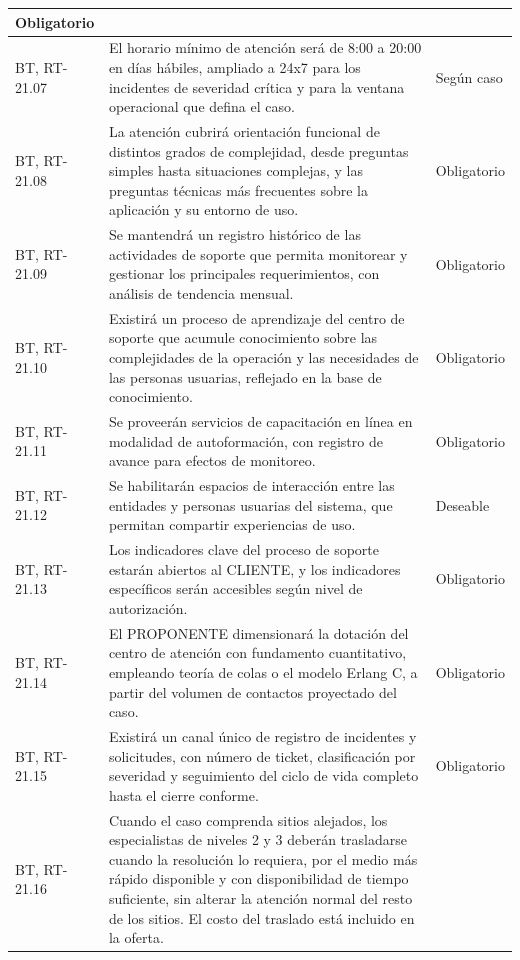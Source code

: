 \begin{longtable}{|L{0.098425\AnchoTablaAnexo}|L{0.814961\AnchoTablaAnexo}|L{0.086614\AnchoTablaAnexo}|}
Obligatorio \\ \hline
{}
BT, RT-21.07 &
El horario mínimo de atención será de 8:00 a 20:00 en días hábiles, ampliado a 24x7 para los incidentes de severidad crítica y para la ventana operacional que defina el caso. &
Según caso \\ \hline
BT, RT-21.08 &
La atención cubrirá orientación funcional de distintos grados de complejidad, desde preguntas simples hasta situaciones complejas, y las preguntas técnicas más frecuentes sobre la aplicación y su entorno de uso. &
Obligatorio \\ \hline
{}
BT, RT-21.09 &
Se mantendrá un registro histórico de las actividades de soporte que permita monitorear y gestionar los principales requerimientos, con análisis de tendencia mensual. &
Obligatorio \\ \hline
BT, RT-21.10 &
Existirá un proceso de aprendizaje del centro de soporte que acumule conocimiento sobre las complejidades de la operación y las necesidades de las personas usuarias, reflejado en la base de conocimiento. &
Obligatorio \\ \hline
{}
BT, RT-21.11 &
Se proveerán servicios de capacitación en línea en modalidad de autoformación, con registro de avance para efectos de monitoreo. &
Obligatorio \\ \hline
BT, RT-21.12 &
Se habilitarán espacios de interacción entre las entidades y personas usuarias del sistema, que permitan compartir experiencias de uso. &
Deseable \\ \hline
{}
BT, RT-21.13 &
Los indicadores clave del proceso de soporte estarán abiertos al CLIENTE, y los indicadores específicos serán accesibles según nivel de autorización. &
Obligatorio \\ \hline
BT, RT-21.14 &
El PROPONENTE dimensionará la dotación del centro de atención con fundamento cuantitativo, empleando teoría de colas o el modelo Erlang C, a partir del volumen de contactos proyectado del caso. &
Obligatorio \\ \hline
{}
BT, RT-21.15 &
Existirá un canal único de registro de incidentes y solicitudes, con número de ticket, clasificación por severidad y seguimiento del ciclo de vida completo hasta el cierre conforme. &
Obligatorio \\ \hline
BT, RT-21.16 &
Cuando el caso comprenda sitios alejados, los especialistas de niveles 2 y 3 deberán trasladarse cuando la resolución lo requiera, por el medio más rápido disponible y con disponibilidad de tiempo suficiente, sin alterar la atención normal del resto de los sitios. El costo del traslado está incluido en la oferta. &

\end{longtable}
